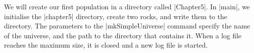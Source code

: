 We will create our first population in a directory called |Chapter5|.
In |main|, we initialise the |chapter5| directory, create two rocks,
and write them to the directory.
The parameters to the |mkSimpleUniverse| command specify the name of the universe,
and the path to the directory that contains it.
When a log file reaches the maximum size, it is closed and a new log file is started.

